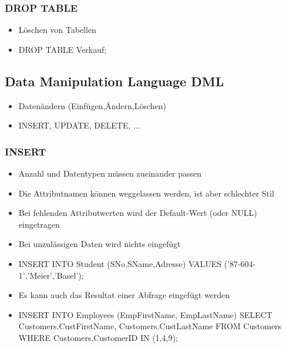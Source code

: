 \documentclass[8pt,a4paper]{scrartcl}
\begin{document}
\begin{multicols*}{3}
				\subsubsection{DROP TABLE}
					\begin{itemize}\itemsep0pt		
						\item Löschen von Tabellen
						\item DROP TABLE Verkauf$;$
					\end{itemize}	

			\subsection{Data Manipulation Language DML}
				\begin{itemize}\itemsep0pt		
					\item Datenändern (Einfügen,Ändern,Löschen)
					\item INSERT, UPDATE, DELETE, ...
				\end{itemize}	
				
				\subsubsection{INSERT}
					\begin{itemize}\itemsep0pt		
						\item Anzahl und Datentypen müssen zueinander passen
						\item Die Attributnamen können weggelassen werden, ist aber schlechter Stil
						\item Bei fehlenden Attributwerten wird der Default-Wert (oder NULL) eingetragen
						\item Bei unzulässigen Daten wird nichts eingefügt
						\item INSERT INTO Student (SNo,SName,Adresse) VALUES ('87-604-1','Meier','Basel')$;$
						\item Es kann auch das Resultat einer Abfrage eingefügt werden
						\item INSERT INTO Employees (EmpFirstName, EmpLastName) SELECT Customers.CustFirstName,
Customers.CustLastName FROM Customers WHERE Customers.CustomerID IN (1,4,9)$;$
					\end{itemize}	
					

\end{multicols*}
\end{document}
